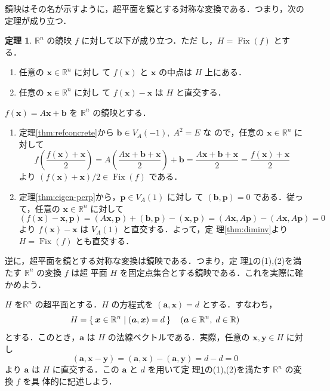 \documentclass[11pt, uplatex, dvipdfmx, titlepage]{jsarticle}
\makeatletter
\DeclareMathOperator{\Fix}{Fix}
\renewenvironment{proof}[1][\proofname]{\par
  \pushQED{\qed}%
  \normalfont \topsep6\p@\@plus6\p@\relax
  \trivlist
  \item[\hskip\labelsep
         \bfseries
    {#1}]\ignorespaces
}{%
  \popQED\endtrivlist\@endpefalse
}
\theoremstyle{definition}
\newtheorem{theorem}{定理}[section]
\renewcommand{\proofname}{\textbf{証明}}
\makeatother
\begin{document}
鏡映はその名が示すように，超平面を鏡とする対称な変換である．つまり，次の定理が成り立つ．

\begin{theorem}\label{thm:ref_is_sym}
  $\mathbb{R}^n$ の鏡映 $f$ に対して以下が成り立つ．ただ
  し，$H=\Fix(f)$ とする．
  \begin{enumerate}[(1)]
  \item 任意の $\bm{x} \in \mathbb{R}^n$ に対し
    て $f(\bm{x})$ と $\bm{x}$ の中点は $H$ 上にある．
    
  \item 任意の $\bm{x} \in \mathbb{R}^n$ に対し
    て $f(\bm{x})-\bm{x}$ は $H$ と直交する．
  \end{enumerate}  
\end{theorem}

\begin{proof}
  $f(\bm{x}) = A\bm{x}+\bm{b}$ を $\mathbb{R}^n$ の鏡映とする．
  \begin{enumerate}[(1)]
  \item 定理\ref{thm:refconcrete}から $\bm{b} \in V_A(-1), \; A^2=E$ な
    ので，任意の $\bm{x} \in \mathbb{R}^n$ に対して
    \[
      f\left( \frac{f(\bm{x}) + \bm{x}}{2}\right) =
      A\left(\frac{A\bm{x}+\bm{b}+\bm{x}}{2}\right)+\bm{b}
      =\frac{A\bm{x} + \bm{b} + \bm{x}}{2} = \frac{f(\bm{x})+\bm{x}}{2}
    \]
    より $\left(f(\bm{x})+\bm{x}\right)/2 \in \Fix(f)$ である．
    
  \item 定理\ref{thm:eigen-perp}から，$\bm{p} \in V_A(1)$ に対し
    て $(\bm{b}, \bm{p})=0$ である．従って，任意の $\bm{x} \in
    \mathbb{R}^n$ に対して
    \[
      \left(f(\bm{x})-\bm{x}, \bm{p}\right)  =(A\bm{x},\bm{p})+(\bm{b},\bm{p}) - (\bm{x},\bm{p})
      =(A\bm{x}, A\bm{p}) - (A\bm{x}, A\bm{p}) = 0
    \]
    より $f(\bm{x})-\bm{x}$ は $V_A(1)$ と直交する．よって，定
    理\ref{thm:diminv}より $H=\Fix(f)$ とも直交する．
  \end{enumerate}
\end{proof}

逆に，超平面を鏡とする対称な変換は鏡映である．つまり，定
理\ref{thm:ref_is_sym}の(1),(2)を満たす $\mathbb{R}^n$ の変換 $f$ は超
平面 $H$ を固定点集合とする鏡映である．これを実際に確かめよう．

$H$ を$\mathbb{R}^n$ の超平面とする．$H$ の方程式を $(\bm{a}, \bm{x})=d$ とする．すなわち，
\[
  H = \Set{ \bm{x} \in \mathbb{R}^n | (\bm{a} , \bm{x}) = d} \quad
  (\bm{a} \in \mathbb{R}^n, \; d \in \mathbb{R})
\]
とする．このとき，$\bm{a}$ は $H$ の法線ベクトルである．実際，任意の $\bm{x}, \bm{y} \in H$ に対し
\[
  (\bm{a}, \bm{x}-\bm{y}) = (\bm{a}, \bm{x}) - (\bm{a}, \bm{y}) = d-d=0
\]
より $\bm{a}$ は $H$ に直交する．この $\bm{a}$ と $d$ を用いて定
理\ref{thm:ref_is_sym}の(1),(2)を満たす $\mathbb{R}^n$ の変換 $f$ を具
体的に記述しよう．
\end{document}
